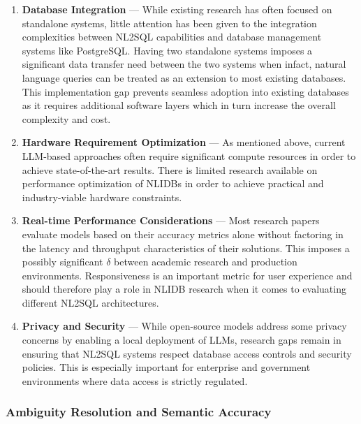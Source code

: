\documentclass{article}
\begin{document}
\begin{enumerate}
    \item \textbf{Database Integration} — While existing research has often focused on standalone systems, little attention
          has been given to the integration complexities between NL2SQL capabilities and database management systems like 
          PostgreSQL. Having two standalone systems imposes a significant data transfer need between the two systems when infact, 
          natural language queries can be treated as an extension to most existing databases. This implementation gap prevents 
          seamless adoption into existing databases as it requires additional software layers which in turn increase the overall 
          complexity and cost.
    \item \textbf{Hardware Requirement Optimization} — As mentioned above, current LLM-based approaches often require significant
          compute resources in order to achieve state-of-the-art results. There is limited research available on performance 
          optimization of NLIDBs in order to achieve practical and industry-viable hardware constraints.
    \item \textbf{Real-time Performance Considerations} — Most research papers evaluate models based on their accuracy metrics 
          alone without factoring in the latency and throughput characteristics of their solutions. This imposes a possibly 
          significant $\delta$ between academic research and production environments. Responsiveness is an important metric for 
          user experience and should therefore play a role in NLIDB research when it comes to evaluating different NL2SQL 
          architectures.
    \item \textbf{Privacy and Security} — While open-source models address some privacy concerns by enabling a local deployment of 
          LLMs, research gaps remain in ensuring that NL2SQL systems respect database access controls and security policies. This 
          is especially important for enterprise and government environments where data access is strictly regulated.
\end{enumerate}

\subsubsection{Ambiguity Resolution and Semantic Accuracy}
\end{document}
